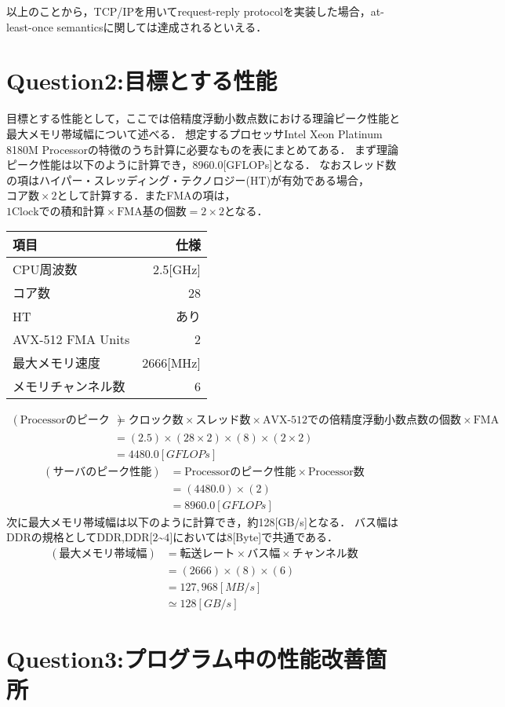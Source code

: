 \documentclass[a4paper,11pt]{jsarticle}
\begin{document}
以上のことから，TCP/IPを用いてrequest-reply protocolを実装した場合，at-least-once semanticsに関しては達成されるといえる．

\newpage
\section{Question2:目標とする性能}
目標とする性能として，ここでは倍精度浮動小数点数における理論ピーク性能と最大メモリ帯域幅について述べる．
想定するプロセッサIntel Xeon Platinum 8180M Processorの特徴のうち計算に必要なものを表にまとめてある．
まず理論ピーク性能は以下のように計算でき，8960.0[GFLOPs]となる．
なおスレッド数の項はハイパー・スレッディング・テクノロジー(HT)が有効である場合，$\mbox{コア数} \times 2$として計算する．またFMAの項は，$\mbox{1Clockでの積和計算} \times \mbox{FMA基の個数} = 2 \times 2$となる．
\begin{table}
	\centering
	\begin{tabular}{| l | r |} \hline
		項目 & 仕様 \\ \hline
		CPU周波数 & 2.5[GHz] \\
		コア数 & 28 \\
		HT & あり\\
		AVX-512 FMA Units & 2 \\
		最大メモリ速度 & 2666[MHz] \\
		メモリチャンネル数 & 6 \\ \hline
	\end{tabular}
\end{table}
	\begin{equation}
	\begin{split}
		\left(\mbox{Processorのピーク性能}\right) & = \mbox{クロック数} \times \mbox{スレッド数} \times \mbox{AVX-512での倍精度浮動小数点数の個数} \times \mbox{FMA} \\
																							& = (2.5) \times (28 \times 2) \times (8) \times (2 \times 2)\\
																							& = 4480.0[GFLOPs]
	\end{split}
	\end{equation}
	\begin{equation}
	\begin{split}
		\left(\mbox{サーバのピーク性能}\right) & = \mbox{Processorのピーク性能} \times \mbox{Processor数} \\
																					 & = (4480.0) \times (2) \\
																					 & = 8960.0[GFLOPs]
	\end{split}
	\end{equation}
	次に最大メモリ帯域幅は以下のように計算でき，約128[GB/s]となる．
	バス幅はDDRの規格としてDDR,DDR$[2$\textasciitilde$4]$においては8[Byte]で共通である．
\begin{equation}
\begin{split}
	(最大メモリ帯域幅) & = 転送レート \times バス幅 \times チャンネル数 \\
										 & = (2666) \times (8) \times (6) \\
										 & = 127,968[MB/s] \\
										 & \simeq 128[GB/s]
\end{split}
\end{equation}
\section{Question3:プログラム中の性能改善箇所}
\end{document}
